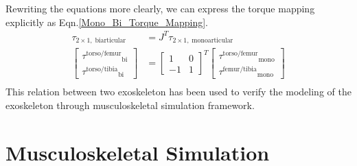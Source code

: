 \documentclass[10pt,letterpaper]{article}
\begin{document}
Rewriting the equations more clearly, we can express the torque mapping explicitly as Eqn.\ref{Mono_Bi_Torque_Mapping}.
\begin{equation}\label{Mono_Bi_Torque_Mapping}
\begin{aligned}
\tau_{2\times 1,\;\mathrm{biarticular}} &=J^T \tau_{2\times 1,\;\mathrm{monoarticular}}\\
\left\lbrack \begin{array}{c}
{\tau^{\mathrm{torso}/\mathrm{femur}} }_{\mathrm{bi}} \\
{\tau^{\mathrm{torso}/\mathrm{tibia}} }_{\mathrm{bi}} 
\end{array}\right\rbrack &={\left\lbrack \begin{array}{cc}
	1 & 0\\
	-1 & 1
	\end{array}\right\rbrack }^T \left\lbrack \begin{array}{c}
{\tau^{\mathrm{torso}/\mathrm{femur}} }_{\mathrm{mono}} \\
{\tau^{\mathrm{femur}/\mathrm{tibia}} }_{\mathrm{mono}} 
\end{array}\right\rbrack\\
\end{aligned}
\end{equation}
This relation between two exoskeleton has been used to verify the modeling of the exoskeleton through musculoskeletal simulation framework.
\section*{Musculoskeletal Simulation}
\end{document}
